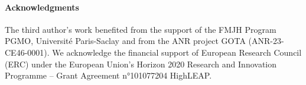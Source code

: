 \documentclass{article}
\begin{document}
\paragraph{Acknowledgments}
The third author's work  benefited from the support of the FMJH Program PGMO, Université Paris-Saclay and from the ANR project GOTA (ANR-23-CE46-0001). We acknowledge the financial support of European Research Council (ERC) under the European Union’s
Horizon 2020 Research and Innovation Programme – Grant Agreement n°101077204 HighLEAP. 




\end{document}
